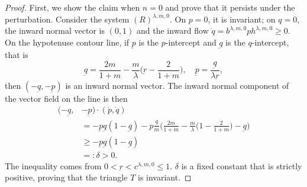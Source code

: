 \documentclass[a4paper,11pt]{article}
\begin{document}
\begin{proof}
First, we show the claim when $n=0$ and prove that it persists under the perturbation. Consider the system $(R)^{\lambda,m,0}$. On $p=0$, it is invariant; on $q=0$, the inward normal vector is $(0,1)$ and the inward flow $\dot{q} = b^{ \lambda,m,0}ph^{ \lambda,m,0} \ge 0$. On the hypotenuse contour line, if $\underbar{p}$ is the $p$-intercept and $\underbar{q}$ is the $q$-intercept, that is
$$ \underbar{q} = \frac{2m}{1+m}-\frac{m}{ \lambda } \big( \underbar{r} - \frac{2}{1+m} \big), \quad \underbar{p} = \frac{ \underbar{q} }{ \lambda \underbar{r} },$$
then $(-\underbar{q}, -\underbar{p})$ is an inward normal vector.
The inward normal component of the vector field on the line is then
\begin{align*} 
 (-\underbar{q}, &-\underbar{p}) \cdot ( \dot{p}, \dot{q} ) \\
 &=-\underbar{p}\underbar{q}(1-\underbar{q}) - p \frac{\underbar{q}}{m}\Big( \frac{2m}{1+m} - \frac{m}{ \lambda} \big( 1-\frac{2}{1+m} \big) - \underbar{q}\Big)\\
 &\ge -\underbar{p}\underbar{q}(1-\underbar{q}) \\%
 &=: \delta >0.
\end{align*}
The inequality comes from $0<\underbar{r} < c^{ \lambda,m,0} \le 1$. $\delta$ is a fixed constant that is strictly positive, proving that the triangle $T$ is invariant.



\end{proof}
\end{document}
